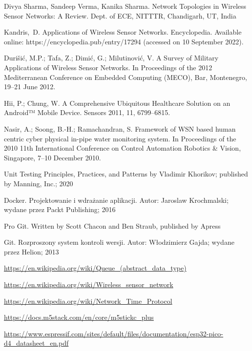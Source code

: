 \documentclass[12pt,oneside,a4paper]{book}
\theoremstyle{break}
\begin{document}
\begin{thebibliography}{00}
    Divya Sharma, Sandeep Verma, Kanika Sharma.
    Network Topologies in Wireless Sensor Networks: A Review.
    Dept. of ECE, NITTTR, Chandigarh, UT, India

    Kandris, D. Applications of Wireless Sensor Networks. Encyclopedia. Available online: https://encyclopedia.pub/entry/17294 (accessed on 10 September 2022).

    Durišić, M.P.; Tafa, Z.; Dimić, G.; Milutinović, V. A Survey of Military Applications of Wireless Sensor Networks. In Proceedings of the 2012 Mediterranean Conference on Embedded Computing (MECO), Bar, Montenegro, 19–21 June 2012.

    Hii, P.; Chung, W. A Comprehensive Ubiquitous Healthcare Solution on an Android™ Mobile Device. Sensors 2011, 11, 6799–6815.

    Nasir, A.; Soong, B.-H.; Ramachandran, S. Framework of WSN based human centric cyber physical in-pipe water monitoring system. In Proceedings of the 2010 11th International Conference on Control Automation Robotics \& Vision, Singapore, 7–10 December 2010.

    Unit Testing Principles, Practices, and Patterns 
    by Vladimir Khorikov;
    published by Manning, Inc.; 2020

    Docker. Projektowanie i wdrażanie aplikacji. Autor:
    Jaroslaw Krochmalski;
    wydane przez Packt Publishing; 2016

    Pro Git. Written by Scott Chacon and Ben Straub,
    published by Apress

    Git. Rozproszony system kontroli wersji. Autor: 
    Włodzimierz Gajda;
    wydane przez Helion; 2013

    \url{https://en.wikipedia.org/wiki/Queue_(abstract_data_type)}

    \url{https://en.wikipedia.org/wiki/Wireless\_sensor\_network}

    \url{https://en.wikipedia.org/wiki/Network_Time_Protocol}

    \url{https://docs.m5stack.com/en/core/m5stickc_plus}

    \url{https://www.espressif.com/sites/default/files/documentation/esp32-pico-d4_datasheet_en.pdf}


\end{thebibliography}
\end{document}
